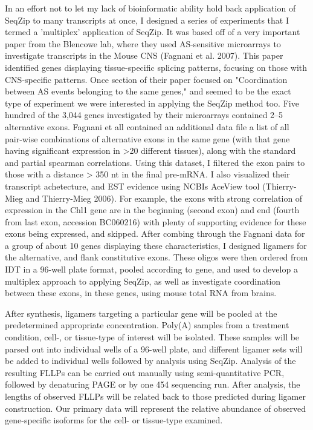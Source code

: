 In an effort not to let my lack of bioinformatic ability hold back application of SeqZip to many transcripts at once, I designed a series of experiments that I termed a 'multiplex' application of SeqZip. It was based off of a very important paper from the Blencowe lab, where they used AS-sensitive microarrays to investigate transcripts in the Mouse CNS (Fagnani et al. 2007). This paper identified genes displaying tissue-specific splicing patterns, focusing on those with CNS-specific patterns. Once section of their paper focused on "Coordination between AS events belonging to the same genes," and seemed to be the exact type of experiment we were interested in applying the SeqZip method too. Five hundred of the 3,044 genes investigated by their microarrays contained 2–5 alternative exons. Fagnani et all contained an additional data file a list of all pair-wise combinations of alternative exons in the same gene (with that gene having significant expression in >20 different tissues), along with the standard and partial spearman correlations. Using this dataset, I filtered the exon pairs to those with a distance > 350 nt in the final pre-mRNA. I also visualized their transcript achetecture, and EST evidence using NCBIs AceView tool (Thierry-Mieg and Thierry-Mieg 2006). For example, the exons with strong correlation of expression in the Chl1 gene are in the beginning (second exon) and end (fourth from last exon, accession BC060216) with plenty of supporting evidence for these exons being expressed, and skipped.  After combing through the Fagnani data for a group of about 10 genes displaying these characteristics, I designed ligamers for the alternative, and flank constitutive exons. These oligos were then ordered from IDT in a 96-well plate format, pooled according to gene, and used to develop a multiplex approach to applying SeqZip, as well as investigate coordination between these exons, in these genes, using mouse total RNA from brains.

After synthesis, ligamers targeting a particular gene will be pooled at the predetermined appropriate concentration. Poly(A) samples from a treatment condition, cell-, or tissue-type of interest will be isolated.  These samples will be parsed out into individual wells of a 96-well plate, and different ligamer sets will be added to individual wells followed by analysis using SeqZip. Analysis of the resulting FLLPs can be carried out manually using semi-quantitative PCR, followed by denaturing PAGE or by one 454 sequencing run.  After analysis, the lengths of observed FLLPs will be related back to those predicted during ligamer construction.  Our primary data will represent the relative abundance of observed gene-specific isoforms for the cell- or tissue-type examined.

